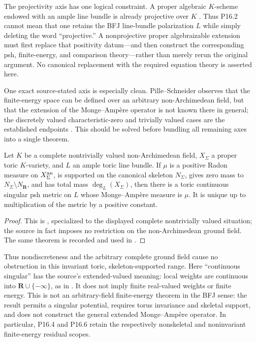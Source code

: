 The projectivity axis has one logical constraint.  A proper algebraic
\(K\)-scheme endowed with an ample line bundle is already projective over
\(K\) \cite[Tag~0B5N]{StacksProject}.  Thus P16.2 cannot mean that one
retains the BFJ line-bundle polarization \(L\) while simply deleting the word
``projective.''  A nonprojective proper algebraizable extension must first
replace that positivity datum---and then construct the corresponding psh,
finite-energy, and comparison theory---rather than merely rerun the original
argument.  No canonical replacement with the required equation theory is
asserted here.

One exact source-stated axis is especially clean.  Pille--Schneider observes
that the finite-energy space can be defined over an arbitrary
non-Archimedean field, but that the extension of the Monge--Amp\`ere operator
is not known there in general; the discretely valued characteristic-zero and
trivially valued cases are the established endpoints
\cite[Remark~4.4]{PS23Hybrid}.  This should be solved before bundling all
remaining axes into a single theorem.

\begin{proposition}
\label{prop:p164-arbitrary-field-toric-skeletal-endpoint}
Let \(K\) be a complete nontrivially valued non-Archimedean field,
\(X_\Sigma\) a proper toric \(K\)-variety, and \(L\) an ample toric line
bundle.  If \(\mu\) is a positive Radon measure on \(X_\Sigma^{\mathrm{an}}\), is
supported on the canonical skeleton \(N_\Sigma\), gives zero mass to
\(N_\Sigma\setminus N_{\mathbf R}\), and has total mass
\(\deg_L(X_\Sigma)\), then there is a toric continuous singular psh metric
on \(L\) whose Monge--Amp\`ere measure is \(\mu\).  It is unique up to
multiplication of the metric by a positive constant.
\end{proposition}

\begin{proof}
This is \cite[Theorem~6.3.13]{BGJKK25}, specialized to the displayed
complete nontrivially valued situation; the source in fact imposes no
restriction on the non-Archimedean ground field.  The same theorem is
recorded and used in .
\end{proof}

Thus nondiscreteness and the arbitrary complete ground field cause no
obstruction in this invariant toric, skeleton-supported range.
Here ``continuous singular'' has the source's extended-valued meaning:
local weights are continuous into \(\mathbf R\cup\{-\infty\}\), as in
\cite[\S5.3.1]{BGJKK25}.  It does not imply finite real-valued weights or
finite energy.  This is not an arbitrary-field finite-energy theorem in the
BFJ sense: the result permits
a singular potential, requires torus invariance and skeletal support, and
does not construct the general extended Monge--Amp\`ere operator.  In
particular, P16.4 and P16.6 retain the respectively nonskeletal and
noninvariant finite-energy residual scopes.

